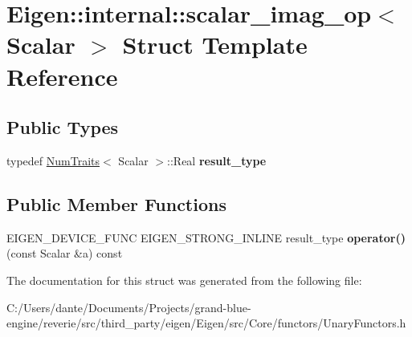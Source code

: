 \hypertarget{struct_eigen_1_1internal_1_1scalar__imag__op}{}\section{Eigen\+::internal\+::scalar\+\_\+imag\+\_\+op$<$ Scalar $>$ Struct Template Reference}
\label{struct_eigen_1_1internal_1_1scalar__imag__op}
\subsection*{Public Types}
\begin{DoxyCompactItemize}
\item 
\mbox{\label{struct_eigen_1_1internal_1_1scalar__imag__op_a9477d3b8605e2e6104af1b3a9537c6ac}} 
typedef \mbox{\hyperlink{struct_eigen_1_1_num_traits}{Num\+Traits}}$<$ Scalar $>$\+::Real {\bfseries result\+\_\+type}
\end{DoxyCompactItemize}
\subsection*{Public Member Functions}
\begin{DoxyCompactItemize}
\item 
\mbox{\label{struct_eigen_1_1internal_1_1scalar__imag__op_afb93c381d61e53ab406e1ca6913b3bfb}} 
E\+I\+G\+E\+N\+\_\+\+D\+E\+V\+I\+C\+E\+\_\+\+F\+U\+NC E\+I\+G\+E\+N\+\_\+\+S\+T\+R\+O\+N\+G\+\_\+\+I\+N\+L\+I\+NE result\+\_\+type {\bfseries operator()} (const Scalar \&a) const
\end{DoxyCompactItemize}


The documentation for this struct was generated from the following file\+:\begin{DoxyCompactItemize}
\item 
C\+:/\+Users/dante/\+Documents/\+Projects/grand-\/blue-\/engine/reverie/src/third\+\_\+party/eigen/\+Eigen/src/\+Core/functors/Unary\+Functors.\+h\end{DoxyCompactItemize}
